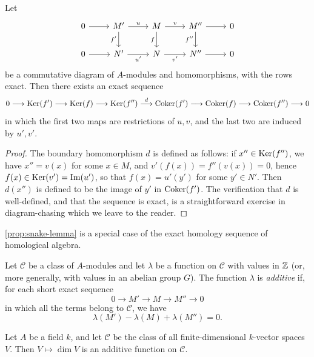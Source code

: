 \begin{proposition}\label{prop:snake-lemma}
Let
\[\begin{tikzcd}
	0 & {M'} & M & {M''} & 0 \\
	0 & {N'} & N & {N''} & 0
	\arrow[from=1-1, to=1-2]
	\arrow["u", from=1-2, to=1-3]
	\arrow["{f'}"', from=1-2, to=2-2]
	\arrow["v", from=1-3, to=1-4]
	\arrow["f"', from=1-3, to=2-3]
	\arrow[from=1-4, to=1-5]
	\arrow["{f''}"', from=1-4, to=2-4]
	\arrow[from=2-1, to=2-2]
	\arrow["{u'}"', from=2-2, to=2-3]
	\arrow["{v'}"', from=2-3, to=2-4]
	\arrow[from=2-4, to=2-5]
\end{tikzcd}\]
be a commutative diagram of $A$-modules and homomorphisms, with the rows exact. Then there exists an exact sequence
\[
    0 \longrightarrow \operatorname{Ker}(f') \longrightarrow \operatorname{Ker}(f) \longrightarrow \operatorname{Ker}(f'') \stackrel{d}{\longrightarrow} \operatorname{Coker}(f') \longrightarrow \operatorname{Coker}(f) \longrightarrow \operatorname{Coker}(f'') \longrightarrow 0
\]
in which the first two maps are restrictions of $u, v$, and the last two are induced by $u', v'$.
\end{proposition}

\begin{proof}
    The boundary homomorphism $d$ is defined as follows: if $x'' \in \operatorname{Ker}(f'')$, we have $x'' = v(x)$ for some $x \in M$, and $v'(f(x)) = f''(v(x)) = 0$, hence $f(x) \in \operatorname{Ker}(v') = \operatorname{Im}(u')$, so that $f(x) = u'(y')$ for some $y' \in N'$. Then $d(x'')$ is defined to be the image of $y'$ in $\operatorname{Coker}(f')$. The verification that $d$ is well-defined, and that the sequence is exact, is a straightforward exercise in diagram-chasing which we leave to the reader.
\end{proof}

\begin{remark}
    \eqref{prop:snake-lemma} is a special case of the exact homology sequence of homological algebra.
\end{remark}

Let $\mathcal{C}$ be a class of $A$-modules and let $\lambda$ be a function on $\mathcal{C}$ with values in $\mathbb{Z}$ (or, more generally, with values in an abelian group $G$). The function $\lambda$ is \emph{additive} if, for each short exact sequence
\[
    0 \longrightarrow M' \longrightarrow M \longrightarrow M'' \longrightarrow 0
\]
in which all the terms belong to $\mathcal{C}$, we have
\[
    \lambda(M') - \lambda(M) + \lambda(M'') = 0.
\]

\begin{example}
Let $A$ be a field $k$, and let $\mathcal{C}$ be the class of all finite-dimensional $k$-vector spaces $V$. Then $V \mapsto \dim V$ is an additive function on $\mathcal{C}$.
\end{example}

